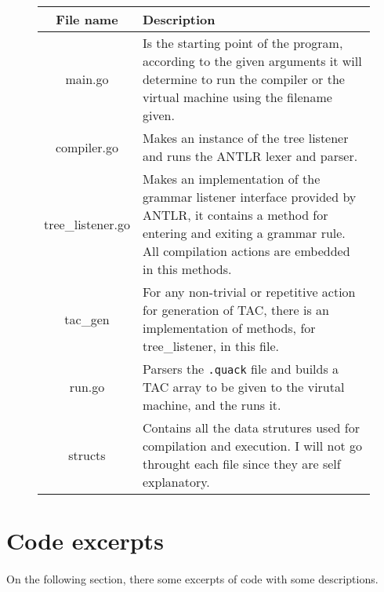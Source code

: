 \begin{figure}[h]
    \centering
    \begin{tabular}{cp{3in}}
        \toprule
        \textbf{File name} & \textbf{Description}\\

        \midrule main.go &
        Is the starting point of the program, according to the given arguments
        it will determine to run the compiler or the virtual machine using the
        filename given.\\

        \midrule compiler.go &
        Makes an instance of the tree listener and runs the ANTLR
        lexer and parser.\\

        \midrule tree\_listener.go &
        Makes an implementation of the grammar listener interface provided by
        ANTLR, it contains a method for entering and exiting a grammar rule.
        All compilation actions are embedded in this methods.\\

        \midrule tac\_gen &
        For any non-trivial or repetitive action for generation of TAC, there
        is an implementation of methods, for tree\_listener, in this file.\\

        \midrule run.go &
        Parsers the \texttt{.quack} file and builds a TAC array to be given 
        to the virutal machine, and the runs it.\\

        \midrule structs &
        Contains all the data strutures used for compilation and execution. I
        will not go throught each file since they are self explanatory.\\

        \bottomrule
    \end{tabular}
\end{figure}

\newpage

\section{Code excerpts}

\paragraph{} On the following section, there some excerpts of code with
some descriptions.

